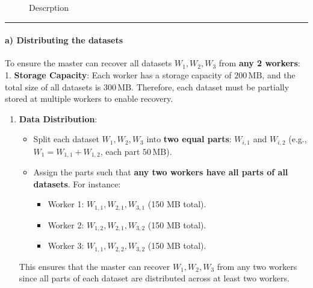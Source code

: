 \documentclass[11pt]{article}
\providecommand{\tightlist}{%
      \setlength{\itemsep}{0pt}\setlength{\parskip}{0pt}}
\begin{document}
\begin{figure}
\centering
{}
\caption{Descrption}
\end{figure}

    \begin{center}\rule{0.5\linewidth}{0.5pt}\end{center}

\paragraph{\texorpdfstring{\textbf{a) Distributing the
datasets}}{a) Distributing the datasets}}\label{a-distributing-the-datasets}

To ensure the master can recover all datasets \(W_1, W_2, W_3\) from
\textbf{any 2 workers}: 1. \textbf{Storage Capacity}: Each worker has a
storage capacity of \(200 \, \text{MB}\), and the total size of all
datasets is \(300 \, \text{MB}\). Therefore, each dataset must be
partially stored at multiple workers to enable recovery.

\begin{enumerate}
\def\labelenumi{\arabic{enumi}.}
\setcounter{enumi}{1}
\tightlist
\item
  \textbf{Data Distribution}:

  \begin{itemize}
  \tightlist
  \item
    Split each dataset \(W_1, W_2, W_3\) into \textbf{two equal parts}:
    \(W_{i,1}\) and \(W_{i,2}\) (e.g., \(W_1 = W_{1,1} + W_{1,2}\), each
    part \(50 \, \text{MB}\)).
  \item
    Assign the parts such that \textbf{any two workers have all parts of
    all datasets}. For instance:

    \begin{itemize}
    \tightlist
    \item
      Worker 1: \(W_{1,1}, W_{2,1}, W_{3,1}\) (150 MB total).
    \item
      Worker 2: \(W_{1,2}, W_{2,1}, W_{3,2}\) (150 MB total).
    \item
      Worker 3: \(W_{1,1}, W_{2,2}, W_{3,2}\) (150 MB total).
    \end{itemize}
  \end{itemize}

  This ensures that the master can recover \(W_1, W_2, W_3\) from any
  two workers since all parts of each dataset are distributed across at
  least two workers.
\end{enumerate}
\end{document}
